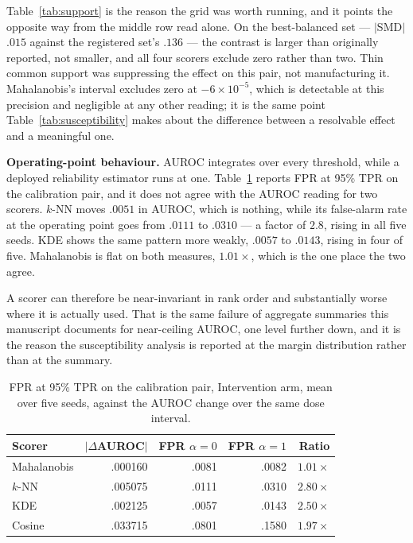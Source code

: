 \documentclass[11pt,a4paper]{article}
\begin{document}
Table~\ref{tab:support} is the reason the grid was worth running, and it points
the opposite way from the middle row read alone. On the best-balanced set ---
$|$SMD$|$ $.015$ against the registered set's $.136$ --- the contrast is larger
than originally reported, not smaller, and all four scorers exclude zero rather
than two. Thin common support was suppressing the effect on this pair, not
manufacturing it. Mahalanobis's interval excludes zero at $-6\times10^{-5}$,
which is detectable at this precision and negligible at any other reading; it is
the same point Table~\ref{tab:susceptibility} makes about the difference between
a resolvable effect and a meaningful one.

\textbf{Operating-point behaviour.} AUROC integrates over every threshold,
while a deployed reliability estimator runs at one. Table~\ref{tab:fpr} reports
FPR at 95\% TPR on the calibration pair, and it does not agree with the AUROC
reading for two scorers. $k$-NN moves $.0051$ in AUROC, which is nothing, while
its false-alarm rate at the operating point goes from $.0111$ to $.0310$ --- a
factor of $2.8$, rising in all five seeds. KDE shows the same pattern more
weakly, $.0057$ to $.0143$, rising in four of five. Mahalanobis is flat on both
measures, $1.01\times$, which is the one place the two agree.

A scorer can therefore be near-invariant in rank order and substantially worse
where it is actually used. That is the same failure of aggregate summaries this
manuscript documents for near-ceiling AUROC, one level further down, and it is
the reason the susceptibility analysis is reported at the margin distribution
rather than at the summary.

\begin{table}[t]
\centering
\caption{FPR at 95\% TPR on the calibration pair, Intervention arm, mean over five seeds, against the AUROC change over the same dose interval.}
\label{tab:fpr}
\small
\begin{tabular}{lrrrr}
\toprule
Scorer & $|\Delta$AUROC$|$ & FPR $\alpha{=}0$ & FPR $\alpha{=}1$ & Ratio\\
\midrule
Mahalanobis & .000160 & .0081 & .0082 & $1.01\times$\\
$k$-NN & .005075 & .0111 & .0310 & $2.80\times$\\
KDE & .002125 & .0057 & .0143 & $2.50\times$\\
Cosine & .033715 & .0801 & .1580 & $1.97\times$\\
\bottomrule
\end{tabular}
\end{table}
\end{document}
